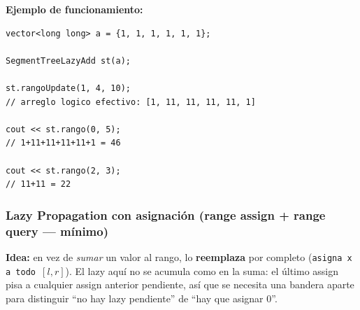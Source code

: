 \documentclass[10pt,a4paper,twocolumn]{article}
\begin{document}
\textbf{Ejemplo de funcionamiento:}

\begin{lstlisting}[style=cpp]
vector<long long> a = {1, 1, 1, 1, 1, 1};

SegmentTreeLazyAdd st(a);

st.rangoUpdate(1, 4, 10);
// arreglo logico efectivo: [1, 11, 11, 11, 11, 1]

cout << st.rango(0, 5);
// 1+11+11+11+11+1 = 46

cout << st.rango(2, 3);
// 11+11 = 22
\end{lstlisting}


\subsubsection{Lazy Propagation con asignación (range assign + range query — mínimo)}

\textbf{Idea:} en vez de \emph{sumar} un valor al rango, lo
\textbf{reemplaza} por completo (\texttt{asigna x a todo
$[l,r]$}). El lazy aquí no se acumula como en la suma: el último
assign pisa a cualquier assign anterior pendiente, así que se necesita
una bandera aparte para distinguir ``no hay lazy pendiente'' de
``hay que asignar 0''.
\end{document}

